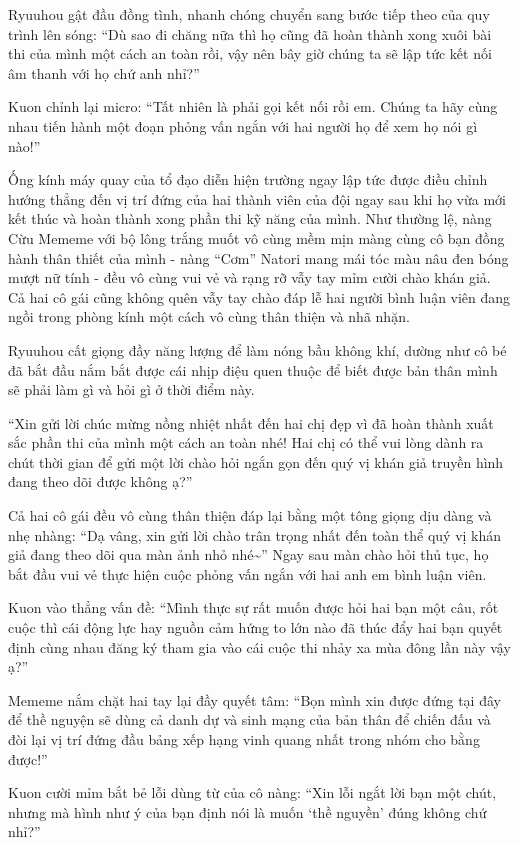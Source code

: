\documentclass[../main.tex]{subfiles}
\begin{document}
Ryuuhou gật đầu đồng tình, nhanh chóng chuyển sang bước tiếp theo của quy trình lên sóng: ``Dù sao đi chăng nữa thì họ cũng đã hoàn thành xong xuôi bài thi của mình một cách an toàn rồi, vậy nên bây giờ chúng ta sẽ lập tức kết nối âm thanh với họ chứ anh nhỉ?''

Kuon chỉnh lại micro: ``Tất nhiên là phải gọi kết nối rồi em. Chúng ta hãy cùng nhau tiến hành một đoạn phỏng vấn ngắn với hai người họ để xem họ nói gì nào!''

Ống kính máy quay của tổ đạo diễn hiện trường ngay lập tức được điều chỉnh hướng thẳng đến vị trí đứng của hai thành viên của đội ngay sau khi họ vừa mới kết thúc và hoàn thành xong phần thi kỹ năng của mình. Như thường lệ, nàng Cừu Mememe với bộ lông trắng muốt vô cùng mềm mịn màng cùng cô bạn đồng hành thân thiết của mình - nàng ``Cơm'' Natori mang mái tóc màu nâu đen bóng mượt nữ tính - đều vô cùng vui vẻ và rạng rỡ vẫy tay mỉm cười chào khán giả. Cả hai cô gái cũng không quên vẫy tay chào đáp lễ hai người bình luận viên đang ngồi trong phòng kính một cách vô cùng thân thiện và nhã nhặn.

Ryuuhou cất giọng đầy năng lượng để làm nóng bầu không khí, dường như cô bé đã bắt đầu nắm bắt được cái nhịp điệu quen thuộc để biết được bản thân mình sẽ phải làm gì và hỏi gì ở thời điểm này.

``Xin gửi lời chúc mừng nồng nhiệt nhất đến hai chị đẹp vì đã hoàn thành xuất sắc phần thi của mình một cách an toàn nhé! Hai chị có thể vui lòng dành ra chút thời gian để gửi một lời chào hỏi ngắn gọn đến quý vị khán giả truyền hình đang theo dõi được không ạ?''

Cả hai cô gái đều vô cùng thân thiện đáp lại bằng một tông giọng dịu dàng và nhẹ nhàng: ``Dạ vâng, xin gửi lời chào trân trọng nhất đến toàn thể quý vị khán giả đang theo dõi qua màn ảnh nhỏ nhé\~{}'' Ngay sau màn chào hỏi thủ tục, họ bắt đầu vui vẻ thực hiện cuộc phỏng vấn ngắn với hai anh em bình luận viên.

Kuon vào thẳng vấn đề: ``Mình thực sự rất muốn được hỏi hai bạn một câu, rốt cuộc thì cái động lực hay nguồn cảm hứng to lớn nào đã thúc đẩy hai bạn quyết định cùng nhau đăng ký tham gia vào cái cuộc thi nhảy xa mùa đông lần này vậy ạ?''

Mememe nắm chặt hai tay lại đầy quyết tâm: ``Bọn mình xin được đứng tại đây để thề nguyện sẽ dùng cả danh dự và sinh mạng của bản thân để chiến đấu và đòi lại vị trí đứng đầu bảng xếp hạng vinh quang nhất trong nhóm cho bằng được!''

Kuon cười mỉm bắt bẻ lỗi dùng từ của cô nàng: ``Xin lỗi ngắt lời bạn một chút, nhưng mà hình như ý của bạn định nói là muốn `thề nguyền' đúng không chứ nhỉ?''
\end{document}
